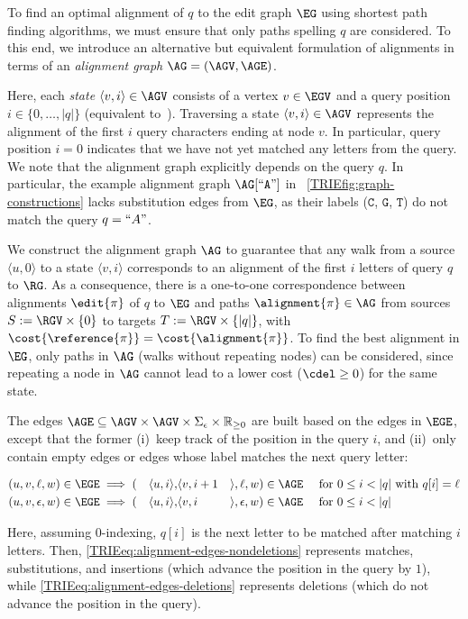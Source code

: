 
To find an optimal alignment of $q$ to the edit graph $\EG$ using shortest path
finding algorithms, we must ensure that only paths spelling $q$ are considered.
To this end, we introduce an alternative but equivalent formulation of
alignments in terms of an \emph{alignment graph} $\AG=(\AGV,\AGE)$.

Here, each \emph{state} $\langle v,i \rangle \in \AGV$ consists of a vertex $v \in
\EGV$ and a query position $i \in \{0,\dots,|q|\}$ (equivalent
to~\cite{rautiainen_aligning_2017}). Traversing a state $\langle v,i \rangle \in
\AGV$ represents the alignment of the first $i$ query characters ending at node $v$.
%
In particular, query position $i=0$ indicates that we have not yet matched any
letters from the query.
%
We note that the alignment graph explicitly depends on the query $q$. In
particular, the example alignment graph $\AG[``\texttt{A}"]$ in
~\cref{TRIEfig:graph-constructions} lacks substitution edges from $\EG$, as their
labels ($\texttt{C}$, $\texttt{G}$, $\texttt{T}$) do not match the query
$q=``A"$.

We construct the alignment graph $\AG$ to guarantee that any walk from a source
$\langle u,0 \rangle$ to a state $\langle v,i \rangle$ corresponds to an
alignment of the first $i$ letters of query $q$ to $\RG$. As a consequence,
there is a one-to-one correspondence between alignments $\edit{\pi}$ of $q$ to
$\EG$ and paths $\alignment{\pi} \in \AG$ from sources $S:=\RGV \times \{0\}$ to
targets $T:=\RGV \times \{|q|\}$, with
$\cost{\reference{\pi}}=\cost{\alignment{\pi}}$. To find the best alignment in
$\EG$, only paths in $\AG$ (walks without repeating nodes) can be considered,
since repeating a node in $\AG$ cannot lead to a lower cost ($\cdel \geq 0$) for
the same state.

\begin{samepage}
The edges $\AGE \subseteq \AGV \times \AGV \times \Sigma_\epsilon \times
\mathbb{R}_{\geq 0}$ are built based on the edges in $\EGE$, except that the
former (i)~keep track of the position in the query $i$, and (ii)~only contain
empty edges or edges
whose label matches the next query letter:

\vspace{-0.7em}
{%
\small
\begin{alignat}{10}
	(u,v,\ell,w) &\in \EGE \implies (&\langle u, i \rangle, &\langle v, i+1
		&&\rangle,\ell,w) \in \AGE \quad \text{ for } 0 \leq i < |q| \text{ with }
		q[i]=\ell \label{TRIEeq:alignment-edges-nondeletions} \\
	(u,v,\epsilon,w) &\in\EGE \implies (&\langle u, i \rangle, &\langle v, i
		&&\rangle,\epsilon,w) \in \AGE \quad \text{ for } 0 \leq i < |q| \label{TRIEeq:alignment-edges-deletions}
\end{alignat}
}%
\end{samepage}
%
Here, assuming $0$-indexing, $q[i]$ is the next letter to be matched after
matching $i$ letters. Then, \cref{TRIEeq:alignment-edges-nondeletions} represents
matches, substitutions, and insertions (which advance the position in the query
by $1$), while \cref{TRIEeq:alignment-edges-deletions} represents deletions (which do
not advance the position in the query).

